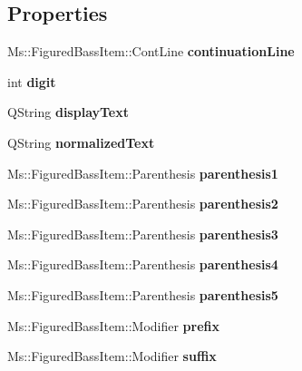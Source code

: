 \subsection*{Properties}
\begin{DoxyCompactItemize}
\item 
\mbox{\label{class_ms_1_1_figured_bass_item_aa56c5a372a2fb69d0ba68c49b20b755e}} 
Ms\+::\+Figured\+Bass\+Item\+::\+Cont\+Line {\bfseries continuation\+Line}
\item 
\mbox{\label{class_ms_1_1_figured_bass_item_ac0d0ba625c68ee2c1e2bf774c8f936fc}} 
int {\bfseries digit}
\item 
\mbox{\label{class_ms_1_1_figured_bass_item_a33bc24e08eae61c69737736da5102f77}} 
Q\+String {\bfseries display\+Text}
\item 
\mbox{\label{class_ms_1_1_figured_bass_item_a03834cf75b01a188cf1930fca8678f9f}} 
Q\+String {\bfseries normalized\+Text}
\item 
\mbox{\label{class_ms_1_1_figured_bass_item_a4ee54447d9783a0012d6c2e829a61cea}} 
Ms\+::\+Figured\+Bass\+Item\+::\+Parenthesis {\bfseries parenthesis1}
\item 
\mbox{\label{class_ms_1_1_figured_bass_item_adb7500540a50a515ead70238f5360c01}} 
Ms\+::\+Figured\+Bass\+Item\+::\+Parenthesis {\bfseries parenthesis2}
\item 
\mbox{\label{class_ms_1_1_figured_bass_item_af6a1a048d4cb24d5e843aa4f8e9995bd}} 
Ms\+::\+Figured\+Bass\+Item\+::\+Parenthesis {\bfseries parenthesis3}
\item 
\mbox{\label{class_ms_1_1_figured_bass_item_af26e39c94a69e4c30138dc9a3b51e911}} 
Ms\+::\+Figured\+Bass\+Item\+::\+Parenthesis {\bfseries parenthesis4}
\item 
\mbox{\label{class_ms_1_1_figured_bass_item_abc33c6ddf15519aa70ba5b4681b4f44b}} 
Ms\+::\+Figured\+Bass\+Item\+::\+Parenthesis {\bfseries parenthesis5}
\item 
\mbox{\label{class_ms_1_1_figured_bass_item_aeb4fff16099ebefa8ecfd39b30f9e04e}} 
Ms\+::\+Figured\+Bass\+Item\+::\+Modifier {\bfseries prefix}
\item 
\mbox{\label{class_ms_1_1_figured_bass_item_ac64106b1ab2abf35f689d71354bbb0fc}} 
Ms\+::\+Figured\+Bass\+Item\+::\+Modifier {\bfseries suffix}
\end{DoxyCompactItemize}
